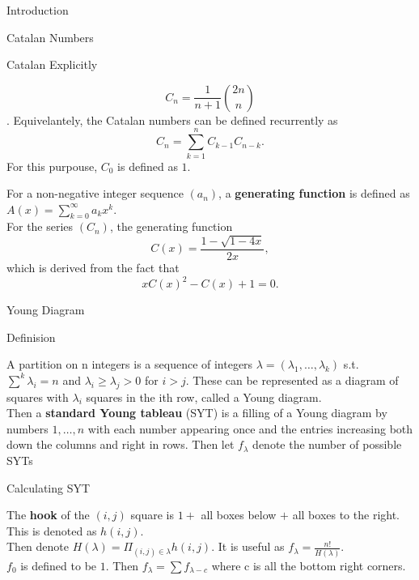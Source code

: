 \documentclass[12pt, letterpaper]{article}
\begin{document}
\begin{section}{Introduction}
\begin{subsection}{Catalan Numbers}
    \begin{subsubsection}{Catalan Explicitly}

      \[C_{n} = \frac{1}{n + 1} {{2n}\choose{n}}\].
      Equivelantely, the Catalan numbers can be defined recurrently
      as \[C_{n} = \sum^{n}_{k=1} C_{k-1} C_{n-k}.\] For this purpouse,
      \(C_{0}\) is defined as \(1\).

      For a non-negative integer sequence \((a_{n})\), a \textbf{generating
        function} is defined as \(A(x) = \sum^{\infty}_{k=0} a_{k} x^{k}\). \\
      For the series \((C_{n})\), the generating
      function \[C(x) = \frac{1 - \sqrt{1 - 4x}}{2x},\]
      which is derived from the fact that \[xC(x)^{2} - C(x) + 1 = 0.\]

    \end{subsubsection}

  \end{subsection}

  \begin{subsection}{Young Diagram}

    \begin{subsubsection}{Definision}

      A partition on n integers is a sequence of integers
      \(\lambda = (\lambda_{1}, \dots, \lambda_{k})\) s.t.\
      \(\sum^{k} \lambda_{i} = n\) and \(\lambda_{i} \geq \lambda_{j} > 0\) for
      \(i > j\). These can be represented as a diagram of squares with
      \(\lambda_{i}\) squares in the ith row, called a Young diagram. \\
      Then a \textbf{standard Young tableau} (SYT) is a filling of a Young
      diagram by numbers \(1, \dots, n\) with each number appearing once and the
      entries increasing both down the columns and right in rows. Then let
      \(f_{\lambda}\) denote the number of possible SYTs

    \end{subsubsection}

    \begin{subsubsection}{Calculating SYT}

      The \textbf{hook} of the \((i, j)\) square is \(1 + \) all boxes below
      \(+\) all boxes to the right. This is denoted as \(h(i, j)\). \\
      Then denote \(H(\lambda) = \Pi_{(i, j) \in \lambda} h(i, j)\). It is
      useful as \(f_{\lambda} = \frac{n!}{H(\lambda)}\). \\
      \(f_{0}\) is defined to be \(1\). Then \(f_{\lambda} =
      \sum f_{\lambda - c}\) where c is all the bottom right corners.


\end{subsubsection}
\end{subsection}
\end{section}
\end{document}
